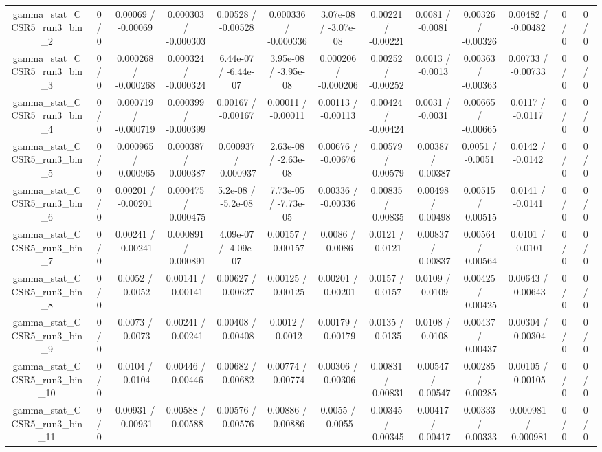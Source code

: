 \documentclass[10pt]{article}
\begin{document}
\begin{table}[htbp]
\begin{center}
\begin{tabular}{|c|c|c|c|c|c|c|c|c|c|c|c|c|}
  gamma_stat_CCSR5_run3_bin_2 & 0 / 0 & 0.00069 / -0.00069 & 0.000303 / -0.000303 & 0.00528 / -0.00528 & 0.000336 / -0.000336 & 3.07e-08 / -3.07e-08 & 0.00221 / -0.00221 & 0.0081 / -0.0081 & 0.00326 / -0.00326 & 0.00482 / -0.00482 & 0 / 0 & 0 / 0 \\ 
  gamma_stat_CCSR5_run3_bin_3 & 0 / 0 & 0.000268 / -0.000268 & 0.000324 / -0.000324 & 6.44e-07 / -6.44e-07 & 3.95e-08 / -3.95e-08 & 0.000206 / -0.000206 & 0.00252 / -0.00252 & 0.0013 / -0.0013 & 0.00363 / -0.00363 & 0.00733 / -0.00733 & 0 / 0 & 0 / 0 \\ 
  gamma_stat_CCSR5_run3_bin_4 & 0 / 0 & 0.000719 / -0.000719 & 0.000399 / -0.000399 & 0.00167 / -0.00167 & 0.00011 / -0.00011 & 0.00113 / -0.00113 & 0.00424 / -0.00424 & 0.0031 / -0.0031 & 0.00665 / -0.00665 & 0.0117 / -0.0117 & 0 / 0 & 0 / 0 \\ 
  gamma_stat_CCSR5_run3_bin_5 & 0 / 0 & 0.000965 / -0.000965 & 0.000387 / -0.000387 & 0.000937 / -0.000937 & 2.63e-08 / -2.63e-08 & 0.00676 / -0.00676 & 0.00579 / -0.00579 & 0.00387 / -0.00387 & 0.0051 / -0.0051 & 0.0142 / -0.0142 & 0 / 0 & 0 / 0 \\ 
  gamma_stat_CCSR5_run3_bin_6 & 0 / 0 & 0.00201 / -0.00201 & 0.000475 / -0.000475 & 5.2e-08 / -5.2e-08 & 7.73e-05 / -7.73e-05 & 0.00336 / -0.00336 & 0.00835 / -0.00835 & 0.00498 / -0.00498 & 0.00515 / -0.00515 & 0.0141 / -0.0141 & 0 / 0 & 0 / 0 \\ 
  gamma_stat_CCSR5_run3_bin_7 & 0 / 0 & 0.00241 / -0.00241 & 0.000891 / -0.000891 & 4.09e-07 / -4.09e-07 & 0.00157 / -0.00157 & 0.0086 / -0.0086 & 0.0121 / -0.0121 & 0.00837 / -0.00837 & 0.00564 / -0.00564 & 0.0101 / -0.0101 & 0 / 0 & 0 / 0 \\ 
  gamma_stat_CCSR5_run3_bin_8 & 0 / 0 & 0.0052 / -0.0052 & 0.00141 / -0.00141 & 0.00627 / -0.00627 & 0.00125 / -0.00125 & 0.00201 / -0.00201 & 0.0157 / -0.0157 & 0.0109 / -0.0109 & 0.00425 / -0.00425 & 0.00643 / -0.00643 & 0 / 0 & 0 / 0 \\ 
  gamma_stat_CCSR5_run3_bin_9 & 0 / 0 & 0.0073 / -0.0073 & 0.00241 / -0.00241 & 0.00408 / -0.00408 & 0.0012 / -0.0012 & 0.00179 / -0.00179 & 0.0135 / -0.0135 & 0.0108 / -0.0108 & 0.00437 / -0.00437 & 0.00304 / -0.00304 & 0 / 0 & 0 / 0 \\ 
  gamma_stat_CCSR5_run3_bin_10 & 0 / 0 & 0.0104 / -0.0104 & 0.00446 / -0.00446 & 0.00682 / -0.00682 & 0.00774 / -0.00774 & 0.00306 / -0.00306 & 0.00831 / -0.00831 & 0.00547 / -0.00547 & 0.00285 / -0.00285 & 0.00105 / -0.00105 & 0 / 0 & 0 / 0 \\ 
  gamma_stat_CCSR5_run3_bin_11 & 0 / 0 & 0.00931 / -0.00931 & 0.00588 / -0.00588 & 0.00576 / -0.00576 & 0.00886 / -0.00886 & 0.0055 / -0.0055 & 0.00345 / -0.00345 & 0.00417 / -0.00417 & 0.00333 / -0.00333 & 0.000981 / -0.000981 & 0 / 0 & 0 / 0 \\ 

\end{tabular}
\end{center}
\end{table}
\end{document}
